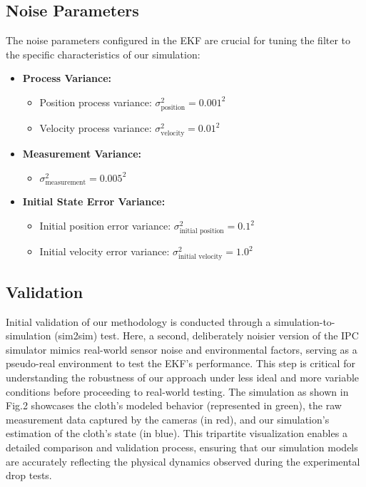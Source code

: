 \documentclass[subscriptcorrection,upint,varvw,barcolor=Goldenrod3,mathalfa=cal=euler,balance,hyphenate,french,pdf-a, nofoot]{asmejour} %
\begin{document}
\subsection*{Noise Parameters}
The noise parameters configured in the EKF are crucial for tuning the filter to the specific characteristics of our simulation:
\begin{itemize}
    \item \textbf{Process Variance:}
    \begin{itemize}
        \item Position process variance: \( \sigma^2_{\text{position}} = 0.001^2 \)
        \item Velocity process variance: \( \sigma^2_{\text{velocity}} = 0.01^2 \)
    \end{itemize}
    \item \textbf{Measurement Variance:}
    \begin{itemize}
        \item \( \sigma^2_{\text{measurement}} = 0.005^2 \)
    \end{itemize}
    \item \textbf{Initial State Error Variance:}
    \begin{itemize}
        \item Initial position error variance: \( \sigma^2_{\text{initial position}} = 0.1^2 \)
        \item Initial velocity error variance: \( \sigma^2_{\text{initial velocity}} = 1.0^2 \)
    \end{itemize}
\end{itemize}

\subsection{Validation}
Initial validation of our methodology is conducted through a simulation-to-simulation (sim2sim) test. Here, a second, deliberately noisier version of the IPC simulator mimics real-world sensor noise and environmental factors, serving as a pseudo-real environment to test the EKF's performance. This step is critical for understanding the robustness of our approach under less ideal and more variable conditions before proceeding to real-world testing.
The simulation as shown in Fig.2 showcases the cloth's modeled behavior (represented in green), the raw measurement data captured by the cameras (in red), and our simulation's estimation of the cloth's state (in blue). This tripartite visualization enables a detailed comparison and validation process, ensuring that our simulation models are accurately reflecting the physical dynamics observed during the experimental drop tests.
\end{document}
